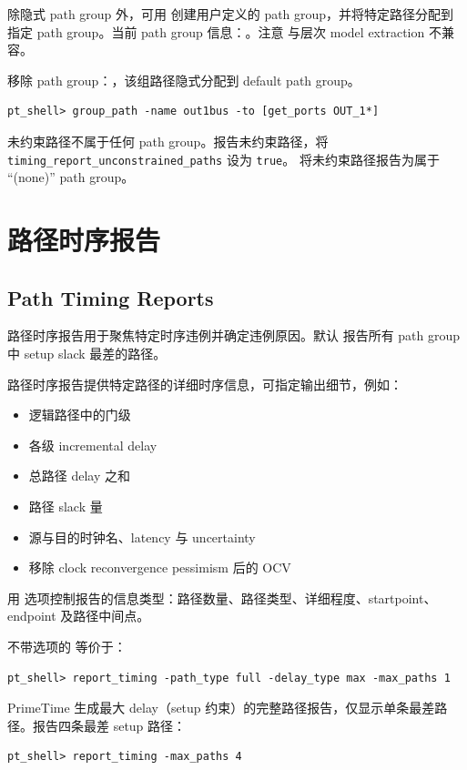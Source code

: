 除隐式 path group 外，可用  创建用户定义的 path group，并将特定路径分配到指定 path group。当前 path group 信息：。注意  与层次 model extraction 不兼容。

移除 path group：，该组路径隐式分配到 default path group。

\begin{lstlisting}
pt_shell> group_path -name out1bus -to [get_ports OUT_1*]
\end{lstlisting}

未约束路径不属于任何 path group。报告未约束路径，将 \texttt{timing\_report\_unconstrained\_paths} 设为 \texttt{true}。 将未约束路径报告为属于 ``(none)'' path group。

\section{路径时序报告}
\subsection*{Path Timing Reports}

路径时序报告用于聚焦特定时序违例并确定违例原因。默认  报告所有 path group 中 setup slack 最差的路径。

路径时序报告提供特定路径的详细时序信息，可指定输出细节，例如：
\begin{itemize}
  \item 逻辑路径中的门级
  \item 各级 incremental delay
  \item 总路径 delay 之和
  \item 路径 slack 量
  \item 源与目的时钟名、latency 与 uncertainty
  \item 移除 clock reconvergence pessimism 后的 OCV
\end{itemize}

用  选项控制报告的信息类型：路径数量、路径类型、详细程度、startpoint、endpoint 及路径中间点。

不带选项的  等价于：
\begin{lstlisting}
pt_shell> report_timing -path_type full -delay_type max -max_paths 1
\end{lstlisting}

PrimeTime 生成最大 delay（setup 约束）的完整路径报告，仅显示单条最差路径。报告四条最差 setup 路径：
\begin{lstlisting}
pt_shell> report_timing -max_paths 4
\end{lstlisting}

